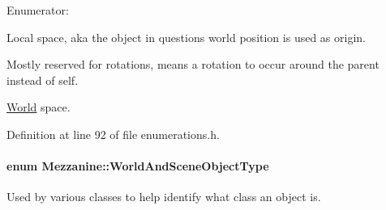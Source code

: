 \begin{Desc}
\item[Enumerator\-: ]\par
\begin{description}
\item[{\em 
\hypertarget{namespaceMezzanine_ad81c74de3529f1e643bd145173924ed3aa1986039b3e4c80c8564c8916e68e61c}{T\-S\-\_\-\-Local}\label{namespaceMezzanine_ad81c74de3529f1e643bd145173924ed3aa1986039b3e4c80c8564c8916e68e61c}
}]Local space, aka the object in questions world position is used as origin. \item[{\em 
\hypertarget{namespaceMezzanine_ad81c74de3529f1e643bd145173924ed3a352c41c07844c77508ce36b43a30b553}{T\-S\-\_\-\-Parent}\label{namespaceMezzanine_ad81c74de3529f1e643bd145173924ed3a352c41c07844c77508ce36b43a30b553}
}]Mostly reserved for rotations, means a rotation to occur around the parent instead of self. \item[{\em 
\hypertarget{namespaceMezzanine_ad81c74de3529f1e643bd145173924ed3aeb8fde3835a59be182f10353d961882d}{T\-S\-\_\-\-World}\label{namespaceMezzanine_ad81c74de3529f1e643bd145173924ed3aeb8fde3835a59be182f10353d961882d}
}]\hyperlink{classMezzanine_1_1World}{World} space. \end{description}
\end{Desc}



Definition at line 92 of file enumerations.\-h.

\hypertarget{namespaceMezzanine_ae8cd04f706f4998be62f454b7119c718}{
\paragraph[{World\-And\-Scene\-Object\-Type}]{\setlength{\rightskip}{0pt plus 5cm}enum {\bf Mezzanine\-::\-World\-And\-Scene\-Object\-Type}}}\label{namespaceMezzanine_ae8cd04f706f4998be62f454b7119c718}


Used by various classes to help identify what class an object is. 

